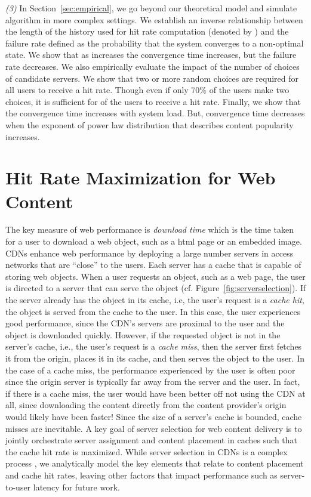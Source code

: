 \documentclass[conference]{IEEEtran}
\begin{document}
{\em (3)} In Section~\ref{sec:empirical}, we go beyond our theoretical model and simulate algorithm  in more complex settings. We establish an inverse relationship between the length of the history used for hit rate computation (denoted by  ) and the failure rate defined as the probability that the system converges to a non-optimal state. We show that as  increases the convergence time increases, but the failure rate decreases. We  also empirically evaluate the impact of the number of choices of candidate servers. We show that two or more random choices are required for all users to receive a  hit rate. Though even if only  70\% of the users  make two choices,  it is sufficient for   of the users to receive a  hit rate. Finally, we show that the convergence time increases with system load. But, convergence time decreases when the exponent of power law distribution that describes content popularity increases. 


\section{Hit Rate Maximization for Web Content}
\label{sec:maxhitrate}
The key measure of web performance is {\em download time} which is the  time taken for a user to download a web object, such as a html page or an embedded image. CDNs enhance web performance by deploying a large number servers in access networks that are ``close'' to the users. Each server has a cache that is capable of storing web objects. When a user requests an object, such as a web page,  the user is directed to a server that can serve the object (cf. Figure~\ref{fig:serverselection}). If the server already has the object in its cache, i.e, the user's request is a  {\em cache hit}, the object is served from the cache to the user. In this case, the user experiences good performance, since the CDN's servers are proximal to the user and the object is downloaded quickly.  However, if the requested object is not in the server's cache, i.e., the user's request is a {\em cache miss}, then the server first fetches it from the origin, places it in its cache, and then serves the object to the user. In the case of a cache miss, the performance experienced by the user is often poor since the origin server is typically far away from the server and the user. In fact, if there is a cache miss, the user would have been better off not using the CDN at all, since downloading the content directly from the content provider's origin would likely have been faster!  Since the size of a server's cache is bounded, cache misses are inevitable.  A key goal of server selection for web content delivery is to jointly orchestrate server assignment and content placement in caches such that the cache hit rate is maximized. While server selection in CDNs is a complex process \cite{nygren2010akamai}, we analytically model the key elements that relate to content placement and cache hit rates,  leaving other factors that impact performance such as server-to-user latency for future work. 
\end{document}
